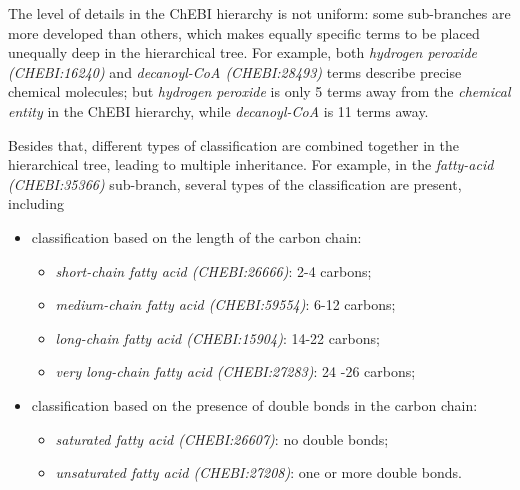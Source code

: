 \documentclass[10pt]{bmc_article}
\newenvironment{bmcformat}{\baselineskip20pt\sloppy\setboolean{publ}{false}}{\baselineskip20pt\sloppy}
\begin{document}
\begin{bmcformat}
The level of details in the ChEBI hierarchy is not uniform: some sub-branches are more developed than others, which makes equally specific terms to be placed unequally deep in the hierarchical tree. For example, both \textit{hydrogen peroxide (CHEBI:16240)} and \textit{decanoyl-CoA (CHEBI:28493)} terms describe precise chemical molecules; but \textit{hydrogen peroxide} is only 5 terms away from the \textit{chemical entity} in the ChEBI hierarchy, while \textit{decanoyl-CoA} is 11 terms away. 

Besides that, different types of classification are combined together in the hierarchical tree, leading to multiple inheritance. For example, in the \textit{fatty-acid (CHEBI:35366)} sub-branch, several types of the classification are present, including
\begin{itemize}
\item classification based on the length of the carbon chain:
\begin{itemize}
\item \textit{short-chain fatty acid (CHEBI:26666)}: 2-4 carbons;
\item \textit{medium-chain fatty acid (CHEBI:59554)}: 6-12 carbons;
\item \textit{long-chain fatty acid (CHEBI:15904)}: 14-22 carbons;
\item \textit{very long-chain fatty acid (CHEBI:27283)}: 24 -26 carbons;
\end{itemize}
\item classification based on the presence of double bonds in the carbon chain:
\begin{itemize}
\item \textit{saturated fatty acid (CHEBI:26607)}: no double bonds;
\item \textit{unsaturated fatty acid (CHEBI:27208)}: one or more double bonds.
\end{itemize}
\end{itemize}


\end{bmcformat}
\end{document}
